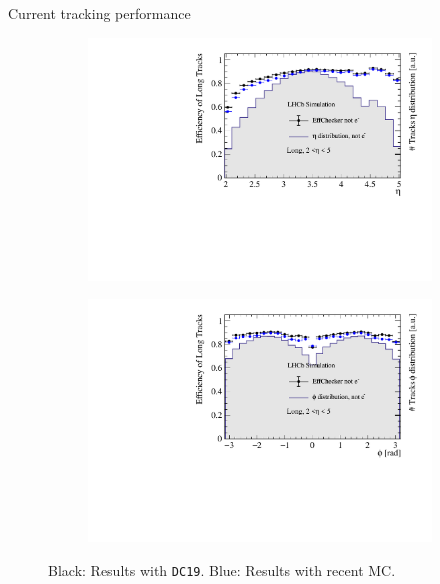 \documentclass[xcolor={dvipsnames}]{beamer}
\begin{document}
\begin{frame}{Current tracking performance}
\begin{figure}[htb]
\begin{subfigure}{0.45\textwidth}
      \includegraphics[width=1\textwidth]{Plots/TrackEfficiency_eta_old_new_MC_comparison.pdf}
    \end{subfigure}%
    \begin{subfigure}{0.45\textwidth}
      \includegraphics[width=1\textwidth]{Plots/TrackEfficiency_phi_old_new_MC_comparison.pdf}
    \end{subfigure}
    \vspace{-0.2cm}
    \caption*{Black: Results with \texttt{DC19}. {\color{blue}Blue: Results with recent MC}.}
  \end{figure}
\end{frame}
\end{document}
